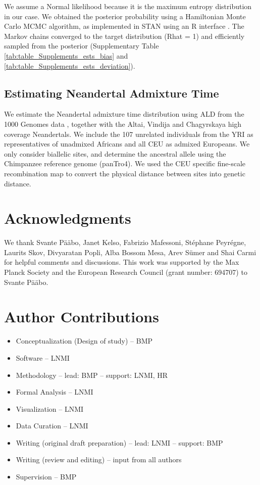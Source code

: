 \documentclass[11pt]{article}
\begin{document}
We assume a Normal likelihood because it is the maximum entropy distribution in our case. We obtained the posterior probability using a Hamiltonian Monte Carlo MCMC algorithm, as implemented in STAN \citep{carpenter_stan_2017} using an R interface \citep{stan_development_team_rstan_2018,mcelreath_statistical_2020}. The Markov chains converged to the target distribution (Rhat = 1) and efficiently sampled from the posterior (Supplementary Table \ref{tab:table_Supplements_ests_bias} and \ref{tab:table_Supplements_ests_deviation}).  


\subsection{Estimating Neandertal Admixture Time}\label{Estimating admixture time from real data}
We estimate the Neandertal admixture time distribution using ALD from the 1000 Genomes data \citep{the_1000_genomes_project_consortium_global_2015}, together with the Altai, Vindija and Chagyrskaya high coverage Neandertals. We  include the 107 unrelated individuals from the YRI as representatives of unadmixed Africans and all CEU as admixed Europeans. We only consider biallelic sites, and determine the ancestral allele using  the Chimpanzee reference genome (panTro4). We used the CEU specific fine-scale recombination map \citep{spence_inference_2019} to convert the physical distance between sites into genetic distance. 

\section{Acknowledgments}

We thank Svante P\"a\"abo, Janet Kelso, Fabrizio Mafessoni, St\'{e}phane Peyr\'{e}gne, Laurits Skov, Divyaratan Popli, Alba Bossom Mesa, Arev S\"umer and Shai Carmi for helpful comments and discussions.
This work was supported by the Max Planck Society and the European Research Council (grant number: 694707) to Svante P\"a\"abo.

\section{Author Contributions}
\begin{itemize}
    \item Conceptualization (Design of study) -- BMP
    \item Software -- LNMI
    \item Methodology -- lead: BMP -- support: LNMI, HR
    \item Formal Analysis -- LNMI
    \item Visualization -- LNMI
    \item Data Curation -- LNMI
    \item Writing (original draft preparation) -- lead: LNMI -- support: BMP
    \item Writing (review and editing) -- input from all authors
    \item Supervision -- BMP
\end{itemize}
\end{document}
